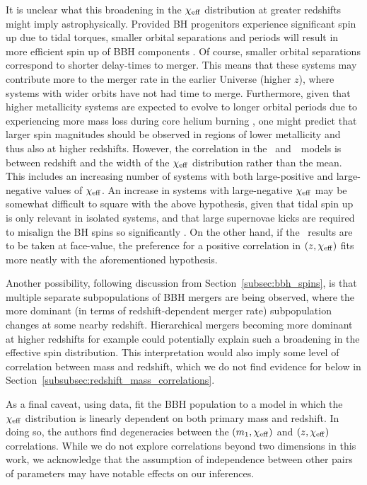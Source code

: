 It is unclear what this broadening in the $\chi_{\rm eff}$ distribution at greater redshifts might imply astrophysically.
Provided \ac{BH} progenitors experience significant spin up due to tidal torques, smaller orbital separations and periods will result in more efficient spin up of \ac{BBH} components \citep{Zaldarriaga:2017qkw, Mapelli:2018uds, Bavera:2020uch, Bavera:2022mef, Fuller:2022ysb}.
Of course, smaller orbital separations correspond to shorter delay-times to merger.
This means that these systems may contribute more to the merger rate in the earlier Universe (higher $z$), where systems with wider orbits have not had time to merge.
Furthermore, given that higher metallicity systems are expected to evolve to longer orbital periods due to experiencing more mass loss during core helium burning \citep{Qin:2018vaa, Fuller:2022ysb}, one might predict that larger spin magnitudes should be observed in regions of lower metallicity and thus also at higher redshifts.
However, the correlation in the \linearcorrelation~and~\splinecorrelation~models is between redshift and the width of the $\chi_{\rm eff}$ distribution rather than the mean.
This includes an increasing number of systems with both large-positive and large-negative values of $\chi_{\rm eff}$.
An increase in systems with large-negative $\chi_{\rm eff}$ may be somewhat difficult to square with the above hypothesis, given that tidal spin up is only relevant in isolated systems, and that large supernovae kicks are required to misalign the \ac{BH} spins so significantly \citep{Kalogera:1999tq,  Wysocki:2017isg, Gerosa:2018wbw, Callister:2020vyz, Steinle:2020xej, Stevenson:2022hmi, Tauris:2022ggv, Baibhav:2024rkn}.
On the other hand, if the \copulacorrelation~results are to be taken at face-value, the preference for a positive correlation in $(z,\chi_{\rm eff})$ fits more neatly with the aforementioned hypothesis.

Another possibility, following discussion from Section~\ref{subsec:bbh_spins}, is that multiple separate subpopulations of \ac{BBH} mergers are being observed, where the more dominant (in terms of redshift-dependent merger rate) subpopulation changes at some nearby redshift.
Hierarchical mergers becoming more dominant at higher redshifts for example could potentially explain such a broadening in the effective spin distribution.
This interpretation would also imply some level of correlation between mass and redshift, which we do not find evidence for below in Section~\ref{subsubsec:redshift_mass_correlations}.

As a final caveat, using \gwtcthree data, \cite{Biscoveanu:2022qac} fit the \ac{BBH} population to a model in which the $\chi_{\rm eff}$ distribution is linearly dependent on both primary mass and redshift.
In doing so, the authors find degeneracies between the $(m_1,\chi_{\rm eff})$ and $(z,\chi_{\rm eff})$ correlations.
While we do not explore correlations beyond two dimensions in this work, we acknowledge that the assumption of independence between other pairs of parameters may have notable effects on our inferences.

